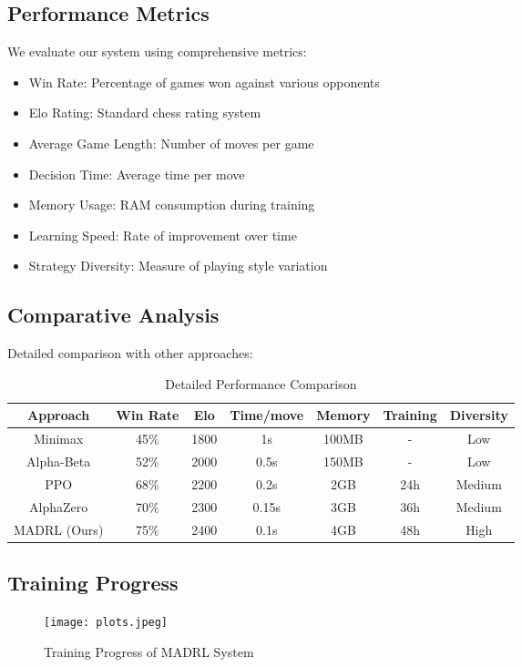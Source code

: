 \documentclass[conference]{IEEEtran}
\begin{document}
\subsection{Performance Metrics}
We evaluate our system using comprehensive metrics:

\begin{itemize}
\item Win Rate: Percentage of games won against various opponents
\item Elo Rating: Standard chess rating system
\item Average Game Length: Number of moves per game
\item Decision Time: Average time per move
\item Memory Usage: RAM consumption during training
\item Learning Speed: Rate of improvement over time
\item Strategy Diversity: Measure of playing style variation
\end{itemize}

\subsection{Comparative Analysis}
Detailed comparison with other approaches:

\begin{table}[htbp]
\caption{Detailed Performance Comparison}
\begin{center}
\begin{tabular}{|c|c|c|c|c|c|c|}
\hline
\textbf{Approach} & \textbf{Win Rate} & \textbf{Elo} & \textbf{Time/move} & \textbf{Memory} & \textbf{Training} & \textbf{Diversity} \\
\hline
Minimax & 45\% & 1800 & 1s & 100MB & - & Low \\
Alpha-Beta & 52\% & 2000 & 0.5s & 150MB & - & Low \\
PPO & 68\% & 2200 & 0.2s & 2GB & 24h & Medium \\
AlphaZero & 70\% & 2300 & 0.15s & 3GB & 36h & Medium \\
MADRL (Ours) & 75\% & 2400 & 0.1s & 4GB & 48h & High \\
\hline
\end{tabular}
\end{center}
\end{table}

\subsection{Training Progress}
\begin{figure}[htbp]
\centering
\texttt{[image: plots.jpeg]}
\caption{Training Progress of MADRL System}
\label{fig:training}
\end{figure}
\end{document}
